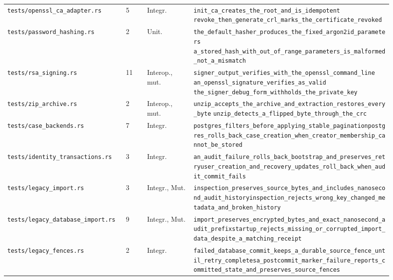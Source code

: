 \begin{longtable}{@{}L{0.285\linewidth}C{0.05\linewidth}L{0.115\linewidth}L{0.47\linewidth}@{}}
  \texttt{tests/openssl\_ca\_adapter.rs} & 5 & Integr. & \texttt{init\_ca\_creates\_the\_root\_and\_is\_idempotent}\newline
    \texttt{revoke\_then\_generate\_crl\_marks\_the\_certificate\_revoked} \\
  \texttt{tests/password\_hashing.rs} & 2 & Unit. & \texttt{the\_default\_hasher\_produces\_the\_fixed\_argon2id\_parameters}\newline
    \texttt{a\_stored\_hash\_with\_out\_of\_range\_parameters\_is\_malformed\_not\_a\_mismatch} \\
  \texttt{tests/rsa\_signing.rs} & 11 & Interop., mut. & \texttt{signer\_output\_verifies\_with\_the\_openssl\_command\_line}\newline
    \texttt{an\_openssl\_signature\_verifies\_as\_valid}\newline
    \texttt{the\_signer\_debug\_form\_withholds\_the\_private\_key} \\
  \texttt{tests/zip\_archive.rs} & 2 & Interop., mut. & \texttt{unzip\_accepts\_the\_archive\_and\_extraction\_restores\_every\_byte}\newline
    \texttt{unzip\_detects\_a\_flipped\_byte\_through\_the\_crc} \\
  \texttt{tests/\allowbreak{}case\_backends.rs} & 7 & Integr. & \texttt{postgres\_filters\_before\_applying\_stable\_pagination}\newline\texttt{postgres\_rolls\_back\_case\_creation\_when\_creator\_membership\_cannot\_be\_stored} \\
  \texttt{tests/\allowbreak{}identity\_transactions.rs} & 3 & Integr. & \texttt{an\_audit\_failure\_rolls\_back\_bootstrap\_and\_preserves\_retry}\newline\texttt{user\_creation\_and\_recovery\_updates\_roll\_back\_when\_audit\_commit\_fails} \\
  \texttt{tests/\allowbreak{}legacy\_import.rs} & 3 & Integr., Mut. & \texttt{inspection\_preserves\_source\_bytes\_and\_includes\_nanosecond\_audit\_history}\newline\texttt{inspection\_rejects\_wrong\_key\_changed\_metadata\_and\_broken\_history} \\
  \texttt{tests/\allowbreak{}legacy\_database\_import.rs} & 9 & Integr., Mut. & \texttt{import\_preserves\_encrypted\_bytes\_and\_exact\_nanosecond\_audit\_prefix}\newline\texttt{startup\_rejects\_missing\_or\_corrupted\_import\_data\_despite\_a\_matching\_receipt} \\
  \texttt{tests/\allowbreak{}legacy\_fences.rs} & 2 & Integr. & \texttt{failed\_database\_commit\_keeps\_a\_durable\_source\_fence\_until\_retry\_completes}\newline\texttt{a\_postcommit\_marker\_failure\_reports\_committed\_state\_and\_preserves\_source\_fences} \\

\end{longtable}
